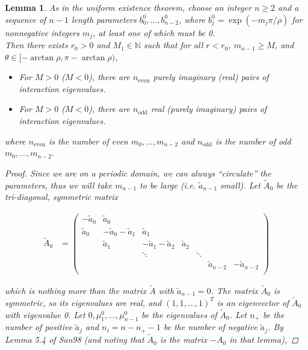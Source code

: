 \documentclass[12pt]{article}
\def\N{{\mathbb N}}
\newtheorem{lemma}{Lemma}
\begin{document}
\begin{lemma}\label{inteigsparity}
As in the uniform existence theorem, choose an integer $n \geq 2$ and a sequence of $n-1$ length parameters $b_0^0, \dots, b_{n-2}^0$, where $b_j^0 = \exp(-m_j \pi / \rho )$ for nonnegative integers $m_j$, at least one of which must be 0.\\

Then there exists $r_0 > 0$ and $M_1 \in \N$ such that for all $r < r_0$, $m_{n-1} \geq M$, and $\theta \in [-\arctan \rho, \pi - \arctan \rho)$, 

\begin{itemize}
\item For $M > 0$ ($M < 0$), there are $n_{\text{even}}$ purely imaginary (real) pairs of interaction eigenvalues.
\item For $M > 0$ ($M < 0$), there are $n_{\text{odd}}$ real (purely imaginary) pairs of interaction eigenvalues.
\end{itemize}

where $n_{\text{even}}$ is the number of even $m_0, \dots, m_{n-2}$ and $n_{\text{odd}}$ is the number of odd $m_0, \dots, m_{n-2}$.

\begin{proof}
Since we are on a periodic domain, we can always ``circulate'' the parameters, thus we will take $m_{n-1}$ to be large (i.e. $\tilde{a}_{n-1}$ small). Let $\tilde{A}_0$ be the tri-diagonal, symmetric matrix 

\begin{align*}
\tilde{A}_0 &= \begin{pmatrix}
-\tilde{a}_0 & \tilde{a}_0 \\
\tilde{a}_0 & -\tilde{a}_0 - \tilde{a}_1 &  \tilde{a}_1 \\
& \tilde{a}_1 & -\tilde{a}_1 - \tilde{a}_2 &  \tilde{a}_2 \\
& & \ddots & & \ddots \\
& & & & & \tilde{a}_{n-2} & -\tilde{a}_{n-2} \\
\end{pmatrix}
\end{align*}

which is nothing more than the matrix $\tilde{A}$ with $\tilde{a}_{n-1} = 0$. The matrix $\tilde{A}_0$ is symmetric, so its eigenvalues are real, and $(1, 1, \dots, 1)^T$ is an eigenvector of $\tilde{A}_0$ with eigenvalue 0. Let $0, \mu^0_1, \dots, \mu^0_{n-1}$ be the eigenvalues of $\tilde{A}_0$. Let $n_+$ be the number of positive $\tilde{a}_j$ and $n_i = n - n_+ - 1$ be the number of negative $\tilde{a}_j$. By Lemma 5.4 of San98 (and noting that $\tilde{A}_0$ is the matrix $-A_0$ in that lemma),


\end{proof}
\end{lemma}
\end{document}
